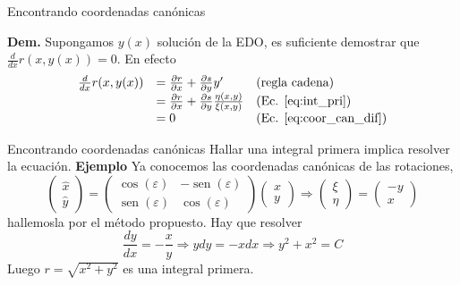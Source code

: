 \documentclass[handout,hyperref={colorlinks=true}]{beamer}
\renewcommand{\epsilon}{\varepsilon}
\DeclareMathOperator{\sen}{sen}
\begin{document}
\begin{frame}{Encontrando coordenadas canónicas}

\textbf{Dem.} Supongamos $y(x)$ solución de la EDO, es suficiente demostrar que $\frac{d}{dx}r(x,y(x))=0$. En efecto
\[
\begin{array}{lll}
 \frac{d}{dx}r(x,y(x)) &=\frac{\partial r}{\partial x}+\frac{\partial s}{\partial y}y' &\text{(regla cadena)}\\
&=\frac{\partial r}{\partial x}+\frac{\partial s}{\partial y}\frac{\eta(x,y)}{\xi(x,y)}& \text{(Ec. \eqref{eq:int_pri})}\\
&=0 & \text{(Ec. \eqref{eq:coor_can_dif})}\\
\end{array}
\]
\end{frame}




\begin{frame}{Encontrando coordenadas canónicas}
Hallar una integral primera implica resolver la ecuación.
\textbf{Ejemplo} Ya conocemos las coordenadas canónicas de las rotaciones, 
\[
 \begin{pmatrix} \hat{x}\\ \hat{y}
\end{pmatrix}=\begin{pmatrix} \cos(\epsilon) & -\sen(\epsilon)
\\ \sen(\epsilon) & \cos(\epsilon)
\end{pmatrix} \begin{pmatrix} x\\ y
\end{pmatrix}\Rightarrow  \begin{pmatrix} \xi\\ \eta
\end{pmatrix}= \begin{pmatrix} -y\\ x
\end{pmatrix}
\]
hallemosla por el método propuesto. Hay que resolver 
\[\frac{dy}{dx}=-\frac{x}{y}\Rightarrow ydy=-xdx\Rightarrow y^2+x^2=C\]
Luego $r=\sqrt{x^2+y^2}$ es una integral primera. 


\end{frame}
\end{document}
